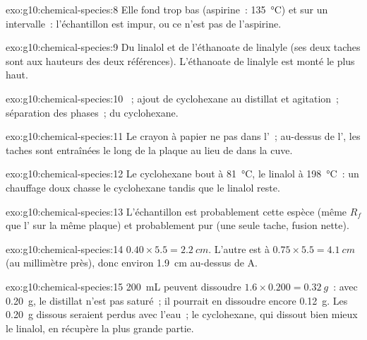 \begin{solution}{exo:g10:chemical-species:8}
Elle fond trop bas (aspirine~: \qty{135}{\celsius}) et sur un
intervalle~: l'échantillon est impur, ou ce n'est pas de l'aspirine.
\end{solution}

\begin{solution}{exo:g10:chemical-species:9}
Du linalol et de l'éthanoate de linalyle (ses deux taches sont aux
hauteurs des deux références). L'éthanoate de linalyle est monté le plus
haut.
\end{solution}

\begin{solution}{exo:g10:chemical-species:10}
~; ajout de cyclohexane au distillat et agitation~;
séparation des phases~;  du cyclohexane.
\end{solution}

\begin{solution}{exo:g10:chemical-species:11}
Le crayon à papier ne  pas dans l'~; au-dessus de
l', les taches sont entraînées le long de la plaque au lieu de  dans la cuve.
\end{solution}

\begin{solution}{exo:g10:chemical-species:12}
Le cyclohexane bout à \qty{81}{\celsius}, le linalol à
\qty{198}{\celsius}~: un chauffage doux chasse le cyclohexane tandis que
le linalol reste.
\end{solution}

\begin{solution}{exo:g10:chemical-species:13}
L'échantillon est probablement cette espèce (même $R_f$ que l' sur la même plaque) et probablement pur (une seule tache,
fusion nette).
\end{solution}

\begin{solution}{exo:g10:chemical-species:14}
$0.40 \times 5.5 = \qty{2.2}{cm}$. L'autre est à $0.75 \times 5.5 =
\qty{4.1}{cm}$ (au millimètre près), donc environ \qty{1.9}{cm} au-dessus
de A.
\end{solution}

\begin{solution}{exo:g10:chemical-species:15}
\qty{200}{mL} peuvent dissoudre $1.6 \times 0.200 = \qty{0.32}{g}$~: avec
\qty{0.20}{g}, le distillat n'est pas saturé~; il pourrait en dissoudre
encore \qty{0.12}{g}. Les \qty{0.20}{g} dissous seraient perdus avec
l'eau~; le cyclohexane, qui dissout bien mieux le linalol, en récupère la
plus grande partie.
\end{solution}

